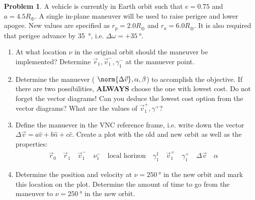 \documentclass[10pt]{article}
\theoremstyle{definition}
\newtheorem{prob}{Problem}[section]
\newenvironment{subprob}%
{\renewcommand{\theenumi}{\alph{enumi}}\renewcommand{\labelenumi}{(\theenumi)}\begin{enumerate}}%
{\end{enumerate}}%
\begin{document}
\begin{prob}
    A vehicle is currently in Earth orbit such that \( e = 0.75\) and \( a = 4.5 R_{\oplus} \).
    A single in-plane maneuver will be used to raise perigee and  lower apogee.
    New values are specified as \( r_p = 2.0 R_{\oplus}\) and  \( r_a = 6.0 R_{\oplus} \). 
    It is also required that perigee advance by \SI{35}{\degree}, i.e. \( \Delta \omega = + \SI{35}{\degree} \).

    \begin{subprob}
    \item At what location \( \nu \) in the original orbit should the maneuver be implemented?
        Determine \( \vec r_1, \vec v_1^{-}, \gamma_1^{-} \) at the manuever point.
    \item Determine the manuever ( \( \norm{\Delta \vec v}, \alpha, \beta \)) to accomplish the objective.
        If there are two possibilities, \textbf{ALWAYS} choose the one with lowest cost. 
        Do not forget the vector diagrams!
        Can you deduce the lowest cost option  from the vector diagrams?
        What are the values of \( \vec v_1^{+}, \gamma^{+} \)?
    \item Define the manuever in the VNC reference frame, i.e. write down the vector \( \Delta \vec v = a \hat v + b \hat n + c \hat c\).
        Create a plot with the old and new orbit as well as the properties: 
        \begin{align*}
            \vec r_0 \quad \vec r_1 \quad \vec v_1^{-} \quad \nu_1^{-} \quad \text{local horizon} \quad \gamma_1^{1} \quad \vec v_1^{+} \quad \gamma_1^{+} \quad \Delta \vec v \quad \alpha 
        \end{align*}
    \item Determine the position and velocity at \( \nu = \SI{250}{\degree} \) in the new orbit and mark this location on the plot.
        Determine the amount of time to go from the maneuver to \( \nu = \SI{250}{\degree} \) in the new orbit.
    \end{subprob}
\end{prob}
\end{document}
